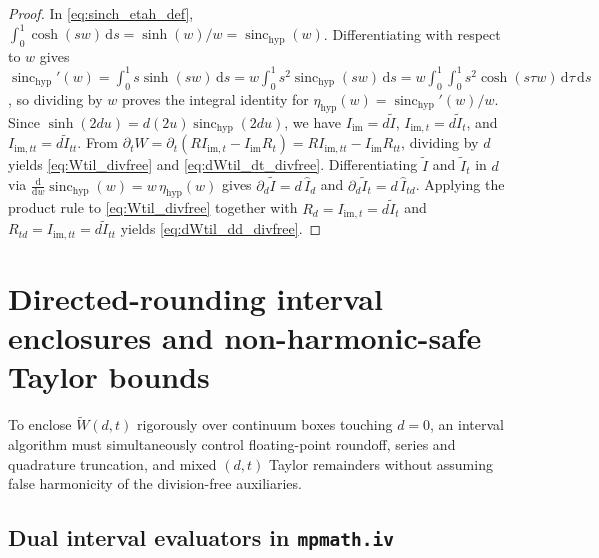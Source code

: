 \documentclass[11pt,a4paper,reqno]{amsart}
\theoremstyle{definition}
\theoremstyle{remark}
\numberwithin{equation}{section}
\newcommand{\dd}{\mathrm{d}}
\newcommand{\Wtil}{\widetilde{W}}
\newcommand{\sinch}{\operatorname{sinc}_{\mathrm{hyp}}}
\newcommand{\etah}{\eta_{\mathrm{hyp}}}
\begin{document}
\begin{proof}
In \eqref{eq:sinch_etah_def}, $\int_0^1 \cosh(s w)\,\dd s = \sinh(w)/w = \sinch(w)$. Differentiating with respect to $w$ gives $\sinch'(w) = \int_0^1 s\sinh(s w)\,\dd s = w\int_0^1 s^2\sinch(s w)\,\dd s = w\int_0^1\int_0^1 s^2\cosh(s\tau w)\,\dd\tau\,\dd s$, so dividing by $w$ proves the integral identity for $\etah(w) = \sinch'(w)/w$. Since $\sinh(2d u) = d(2u)\sinch(2d u)$, we have $I_{\mathrm{im}} = d\widetilde{I}$, $I_{\mathrm{im},t} = d\widetilde{I}_t$, and $I_{\mathrm{im},tt} = d\widetilde{I}_{tt}$. From $\partial_t W = \partial_t(R I_{\mathrm{im},t} - I_{\mathrm{im}}R_t) = R I_{\mathrm{im},tt} - I_{\mathrm{im}}R_{tt}$, dividing by $d$ yields \eqref{eq:Wtil_divfree} and \eqref{eq:dWtil_dt_divfree}. Differentiating $\widetilde{I}$ and $\widetilde{I}_t$ in $d$ via $\frac{\dd}{\dd w}\sinch(w) = w\,\etah(w)$ gives $\partial_d\widetilde{I} = d\,\widehat{I}_d$ and $\partial_d\widetilde{I}_t = d\,\widehat{I}_{td}$. Applying the product rule to \eqref{eq:Wtil_divfree} together with $R_d = I_{\mathrm{im},t} = d\widetilde{I}_t$ and $R_{td} = I_{\mathrm{im},tt} = d\widetilde{I}_{tt}$ yields \eqref{eq:dWtil_dd_divfree}.
\end{proof}

\section{Directed-rounding interval enclosures and non-harmonic-safe Taylor bounds}\label{sec:interval}

To enclose $\Wtil(d,t)$ rigorously over continuum boxes touching $d = 0$, an interval algorithm must simultaneously control floating-point roundoff, series and quadrature truncation, and mixed $(d,t)$ Taylor remainders without assuming false harmonicity of the division-free auxiliaries.

\subsection{Dual interval evaluators in \texorpdfstring{\texttt{mpmath.iv}}{mpmath.iv}}\label{subsec:dual_evaluators}
\end{document}
